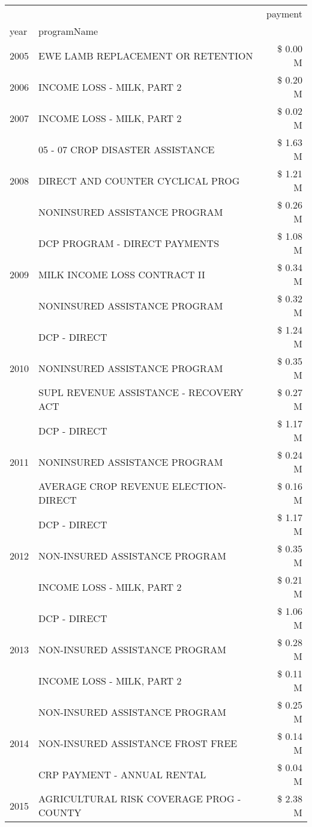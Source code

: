 \begin{tabular}{llr}
\toprule
 &  & payment \\
year & programName &  \\
\midrule
2005 & EWE LAMB REPLACEMENT OR RETENTION & \$ 0.00 M \\
\cline{1-3}
2006 & INCOME LOSS - MILK, PART 2 & \$ 0.20 M \\
\cline{1-3}
2007 & INCOME LOSS - MILK, PART 2 & \$ 0.02 M \\
\cline{1-3}
\multirow[t]{3}{*}{2008} & 05 - 07 CROP DISASTER ASSISTANCE & \$ 1.63 M \\
 & DIRECT AND COUNTER CYCLICAL PROG & \$ 1.21 M \\
 & NONINSURED ASSISTANCE PROGRAM & \$ 0.26 M \\
\cline{1-3}
\multirow[t]{3}{*}{2009} & DCP PROGRAM - DIRECT PAYMENTS & \$ 1.08 M \\
 & MILK INCOME LOSS CONTRACT II & \$ 0.34 M \\
 & NONINSURED ASSISTANCE PROGRAM & \$ 0.32 M \\
\cline{1-3}
\multirow[t]{3}{*}{2010} & DCP - DIRECT & \$ 1.24 M \\
 & NONINSURED ASSISTANCE PROGRAM & \$ 0.35 M \\
 & SUPL REVENUE ASSISTANCE - RECOVERY ACT & \$ 0.27 M \\
\cline{1-3}
\multirow[t]{3}{*}{2011} & DCP - DIRECT & \$ 1.17 M \\
 & NONINSURED ASSISTANCE PROGRAM & \$ 0.24 M \\
 & AVERAGE CROP REVENUE ELECTION-DIRECT & \$ 0.16 M \\
\cline{1-3}
\multirow[t]{3}{*}{2012} & DCP - DIRECT & \$ 1.17 M \\
 & NON-INSURED ASSISTANCE PROGRAM & \$ 0.35 M \\
 & INCOME LOSS - MILK, PART 2 & \$ 0.21 M \\
\cline{1-3}
\multirow[t]{3}{*}{2013} & DCP - DIRECT & \$ 1.06 M \\
 & NON-INSURED ASSISTANCE PROGRAM & \$ 0.28 M \\
 & INCOME LOSS - MILK, PART 2 & \$ 0.11 M \\
\cline{1-3}
\multirow[t]{3}{*}{2014} & NON-INSURED ASSISTANCE PROGRAM & \$ 0.25 M \\
 & NON-INSURED ASSISTANCE FROST FREE & \$ 0.14 M \\
 & CRP PAYMENT - ANNUAL RENTAL & \$ 0.04 M \\
\cline{1-3}
\multirow[t]{3}{*}{2015} & AGRICULTURAL RISK COVERAGE PROG - COUNTY & \$ 2.38 M \\

\end{tabular}

